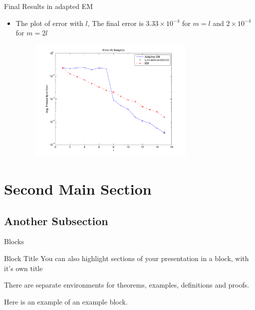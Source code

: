 \documentclass{beamer}
\begin{document}
\begin{frame}{Final Results in adapted EM}
    \begin{itemize}
    \item {
    The plot of error with $l$, The final error is $3.33\times 10^{-4}$ for $m = l$ and $2\times 10^{-4}$ for $m = 2l$
    \begin{figure}[h!]
   \centering
     \includegraphics[width=0.75\textwidth]{avg_error2.pdf}
\end{figure}
    }
    \end{itemize}
\end{frame}




\iffalse
\section{Second Main Section}

\subsection{Another Subsection}

\begin{frame}{Blocks}
\begin{block}{Block Title}
You can also highlight sections of your presentation in a block, with it's own title
\end{block}
\begin{theorem}
There are separate environments for theorems, examples, definitions and proofs.
\end{theorem}
\begin{example}
Here is an example of an example block.
\end{example}
\end{frame}
\end{document}
